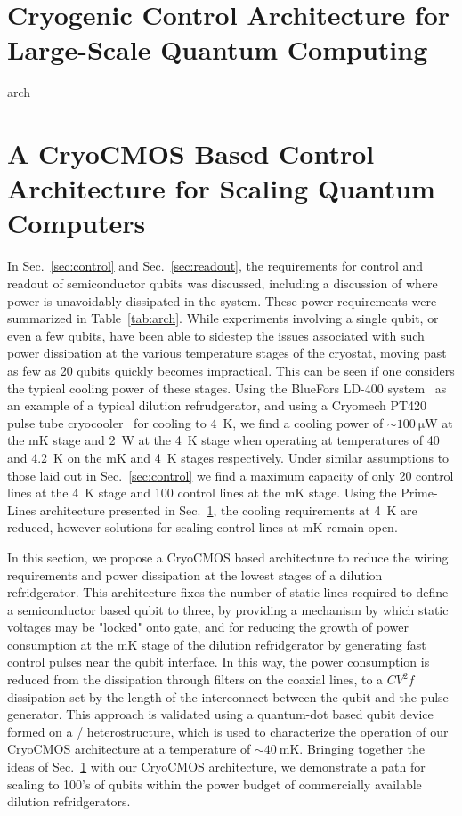 \clearpage
\section{Cryogenic Control Architecture for Large-Scale Quantum Computing}
\label{sec:primelines}
{arch}

\clearpage
\section{A CryoCMOS Based Control Architecture for Scaling Quantum Computers}
\label{sec:gooseberry}

In Sec.~\ref{sec:control} and Sec.~\ref{sec:readout}, the requirements for control and readout of semiconductor qubits was discussed, including a discussion
of where power is unavoidably dissipated in the system. These power requirements were summarized in Table~\ref{tab:arch}. While experiments involving a single qubit, or even a few
qubits, have been able to sidestep the issues associated with such power dissipation at the various temperature stages of the cryostat, moving past as few as 20 qubits quickly
becomes impractical. This can be seen if one considers the typical cooling power of these stages. Using the BlueFors LD-400 system~\cite{bluefors}
as an example of a typical dilution refrudgerator, and using a Cryomech PT420 pulse tube cryocooler~\cite{cryomech} for cooling
to \SI{4}{\kelvin}, we find a cooling power of $\sim \SI{100}{\micro\watt}$ at the mK stage and \SI{2}{\watt} at the \SI{4}{\kelvin} stage when operating at
temperatures of \SI{40}{\mk} and \SI{4.2}{\kelvin} on the mK and \SI{4}{\kelvin} stages respectively. Under similar assumptions to those laid out in Sec.~\ref{sec:control}
we find a maximum capacity of only 20 control lines at the \SI{4}{\kelvin} stage and 100 control lines at the mK stage. Using the Prime-Lines architecture
presented in Sec.~\ref{sec:primelines}, the cooling requirements at \SI{4}{\kelvin} are reduced, however solutions for scaling control lines at mK remain
open.

In this section, we propose a CryoCMOS based architecture to reduce the wiring requirements and power dissipation at the lowest stages of a dilution refridgerator. This architecture
fixes the number of static lines required to define a semiconductor based qubit to three, by providing a mechanism by which static voltages may be "locked" onto gate, and for
reducing the growth of power consumption at the mK stage of the dilution refridgerator by generating fast control pulses near the qubit interface. In this way, the power
consumption is reduced from the dissipation through filters on the coaxial lines, to a $CV^2f$ dissipation set by the length of the interconnect between the qubit and the pulse
generator. This approach is validated using a quantum-dot based qubit device formed on a / heterostructure, which is used to characterize the operation of
our CryoCMOS architecture at a temperature of $\sim \SI{40}{\milli\kelvin}$. Bringing together the ideas of Sec.~\ref{sec:primelines} with our CryoCMOS architecture, we demonstrate
a path for scaling to 100's of qubits within the power budget of commercially available dilution refridgerators.

